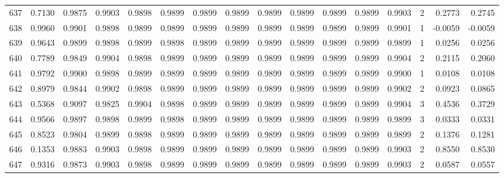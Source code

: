 \begin{tabular}{lrrrrrrrrrrrrrrr}
637 &      0.7130 &  0.9875 &  0.9903 &  0.9898 &  0.9899 &  0.9899 &  0.9899 &  0.9899 &  0.9899 &  0.9899 &   0.9899 &     0.9903 &      2 &                    0.2773 &                     0.2745 \\
638 &      0.9960 &  0.9901 &  0.9898 &  0.9899 &  0.9899 &  0.9899 &  0.9899 &  0.9899 &  0.9899 &  0.9899 &   0.9899 &     0.9901 &      1 &                   -0.0059 &                    -0.0059 \\
639 &      0.9643 &  0.9899 &  0.9898 &  0.9899 &  0.9898 &  0.9899 &  0.9899 &  0.9899 &  0.9899 &  0.9899 &   0.9899 &     0.9899 &      1 &                    0.0256 &                     0.0256 \\
640 &      0.7789 &  0.9849 &  0.9904 &  0.9898 &  0.9899 &  0.9899 &  0.9899 &  0.9899 &  0.9899 &  0.9899 &   0.9899 &     0.9904 &      2 &                    0.2115 &                     0.2060 \\
641 &      0.9792 &  0.9900 &  0.9898 &  0.9899 &  0.9899 &  0.9899 &  0.9899 &  0.9899 &  0.9899 &  0.9899 &   0.9899 &     0.9900 &      1 &                    0.0108 &                     0.0108 \\
642 &      0.8979 &  0.9844 &  0.9902 &  0.9898 &  0.9899 &  0.9899 &  0.9899 &  0.9899 &  0.9899 &  0.9899 &   0.9899 &     0.9902 &      2 &                    0.0923 &                     0.0865 \\
643 &      0.5368 &  0.9097 &  0.9825 &  0.9904 &  0.9898 &  0.9899 &  0.9899 &  0.9899 &  0.9899 &  0.9899 &   0.9899 &     0.9904 &      3 &                    0.4536 &                     0.3729 \\
644 &      0.9566 &  0.9897 &  0.9898 &  0.9899 &  0.9898 &  0.9899 &  0.9899 &  0.9899 &  0.9899 &  0.9899 &   0.9899 &     0.9899 &      3 &                    0.0333 &                     0.0331 \\
645 &      0.8523 &  0.9804 &  0.9899 &  0.9898 &  0.9899 &  0.9899 &  0.9899 &  0.9899 &  0.9899 &  0.9899 &   0.9899 &     0.9899 &      2 &                    0.1376 &                     0.1281 \\
646 &      0.1353 &  0.9883 &  0.9903 &  0.9898 &  0.9899 &  0.9899 &  0.9899 &  0.9899 &  0.9899 &  0.9899 &   0.9899 &     0.9903 &      2 &                    0.8550 &                     0.8530 \\
647 &      0.9316 &  0.9873 &  0.9903 &  0.9898 &  0.9899 &  0.9899 &  0.9899 &  0.9899 &  0.9899 &  0.9899 &   0.9899 &     0.9903 &      2 &                    0.0587 &                     0.0557 \\

\end{tabular}
